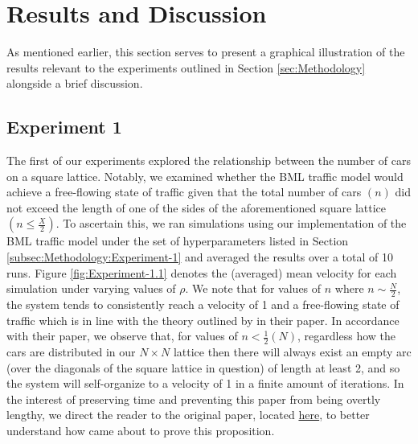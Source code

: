 \section{Results and Discussion}
\label{sec:Results-and-Discussion}
As mentioned earlier, this section serves to present a graphical illustration of the results relevant to the experiments outlined in Section \ref{sec:Methodology} alongside a brief discussion.

\subsection{Experiment 1}
\label{subsec:Results-and-Discussion:Experiment-1}
The first of our experiments explored the relationship between the number of cars on a square lattice. Notably, we examined whether the BML traffic model would achieve a free-flowing state of traffic given that the total number of cars $(n)$ did not exceed the length of one of the sides of the aforementioned square lattice $\left(n \leq \frac{X}{2}\right)$. To ascertain this, we ran simulations using our implementation of the BML traffic model under the set of hyperparameters listed in Section \ref{subsec:Methodology:Experiment-1} and averaged the results over a total of 10 runs. Figure \ref{fig:Experiment-1.1} denotes the (averaged) mean velocity for each simulation under varying values of $\rho$. We note that for values of $n$ where $n \sim \frac{N}{2}$, the system tends to consistently reach a velocity of 1 and a free-flowing state of traffic which is in line with the theory outlined by \citeauthor{Austin} in their paper. In accordance with their paper, we observe that, for values of  $n < \frac{1}{2}(N)$, regardless how the cars are distributed in our $N \times N$ lattice then there will always exist an empty arc (over the diagonals of the square lattice in question) of length at least 2, and so the system will self-organize to a velocity of 1 in a finite amount of iterations. In the interest of preserving time and preventing this paper from being overtly lengthy, we direct the reader to the original paper, located \href{https://arxiv.org/pdf/math/0607759.pdf}{here}, to better understand how \citeauthor{Austin} came about to prove this proposition. 

